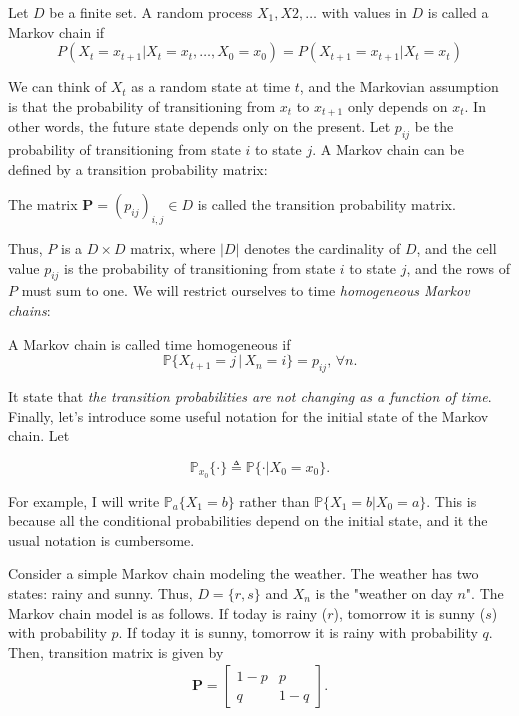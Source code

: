 \begin{definition}
	Let $D$ be a finite set. A random process $X_1, X2,\dots$  with values in $D$ is called a Markov chain if
$$P(X_t=x_{t+1}|X_{t}=x_t,\dots,X_0=x_0)=P(X_{t+1}=x_{t+1}|X_{t}=x_t)$$
\label{def:markov_chain}
\end{definition}
We can think of $X_t$ as a random state at time $t$, and the Markovian assumption is that the probability of transitioning from $x_t$ to $x_{t+1}$ only depends on $x_t$. In other words, the future state depends only on the present. Let $p_{ij}$ be the probability of transitioning from state $i$ to state $j$. A Markov chain can be defined by a transition probability matrix:
\begin{definition}
	The matrix $\mathbf{P}=(p_{ij})_{i,j}\in D$ is called the transition probability matrix.
\label{def:markov_chain_transition_matrix}
\end{definition}
Thus, $P$ is a $D \times D$ matrix, where $|D|$ denotes the cardinality of $D$, and the cell value $p_{ij}$ is the probability of transitioning from state $i$ to state $j$, and the rows of $P$ must sum to one. We will restrict ourselves to time \textit{homogeneous Markov chains}:

\begin{definition}
A Markov chain is called time homogeneous if 
$$\mathbb{P}\{X_{t+1}=j\, |\, X_n=i\}=p_{ij},\, \forall n.$$
\end{definition}
It state that \textit{the transition probabilities are not changing as a function of time}. Finally, let's introduce some useful notation for the initial state of the Markov chain. Let

$$\mathbb{P}_{x_0}\{\cdot\}\triangleq \mathbb{P}\{\cdot | X_0=x_0\}.$$

For example, I will write $\mathbb{P}_a\{X_1=b\}$ rather than $\mathbb{P}\{X_1=b|X_0=a\}$. This is because all the conditional probabilities depend on the initial state, and it the usual notation is cumbersome.

Consider a simple Markov chain modeling the weather. The weather has two states: rainy and sunny. Thus, $D = \{r, s\}$ and $X_n$ is the "weather on day $n$". The Markov chain model is as follows. If today is rainy ($r$), tomorrow it is sunny ($s$) with probability $p$. If today it is sunny, tomorrow it is rainy with probability $q$. Then, transition matrix is given by 
\begin{align*}
	\mathbf{P} = 
	\begin{bmatrix}
		1-p & p\\
		q & 1-q
	\end{bmatrix}.
\end{align*}

